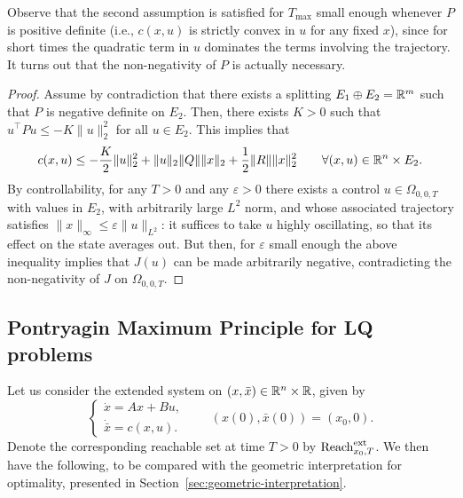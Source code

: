 Observe that the second assumption is satisfied for $T_{\max}$ small enough whenever $P$ is positive definite (i.e., $c(x,u)$ is strictly convex in $u$ for any fixed $x$), since for short times the quadratic term in $u$ dominates the terms involving the trajectory.
It turns out that the non-negativity of $P$ is actually necessary.


\begin{proof}
    Assume by contradiction that there exists a splitting $E_1\oplus E_2 = \mathbb{R}^m$ such that $P$ is negative definite on $E_2$.
    Then, there exists $K>0$ such that $u^\top P u \le -K \|u\|_2^2$ for all $u\in E_2$.
    This implies that 
    \begin{equation}
        c(x,u) \le -\frac{K}2 \|u\|_2^2 + \|u\|_2\|Q\|\|x\|_2 + \frac12 \|R\|\|x\|_2^2 \qquad \forall (x,u)\in \mathbb{R}^n\times E_2.
    \end{equation}
    By controllability, for any $T>0$ and any $\varepsilon>0$ there exists a control $u\in \Omega_{0,0,T}$ with values in $E_2$, with arbitrarily large $L^2$ norm, and whose associated trajectory satisfies $\|x\|_\infty\le \varepsilon\|u\|_{L^2}$: it suffices to take $u$ highly oscillating, so that its effect on the state averages out.
     But then, for $\varepsilon$ small enough the above inequality implies that $J(u)$ can be made arbitrarily negative, contradicting the non-negativity of $J$ on $\Omega_{0,0,T}$.
\end{proof}

\subsection{Pontryagin Maximum Principle for LQ problems}

Let us consider the extended system on $(x,\bar x)\in \mathbb{R}^n\times \mathbb{R}$, given by 
\begin{equation}
    \begin{cases}
        \dot x = Ax + B u,\\
        \dot{\bar x} = c(x,u).
    \end{cases}
    \qquad 
    (x(0),\bar x(0)) = (x_0,0).
\end{equation}
Denote the corresponding reachable set at time $T>0$ by $\operatorname{Reach}^{\text{ext}}_{x_0,T}$.
We then have the following, to be compared with the geometric interpretation for optimality, presented in Section~\ref{sec:geometric-interpretation}.

